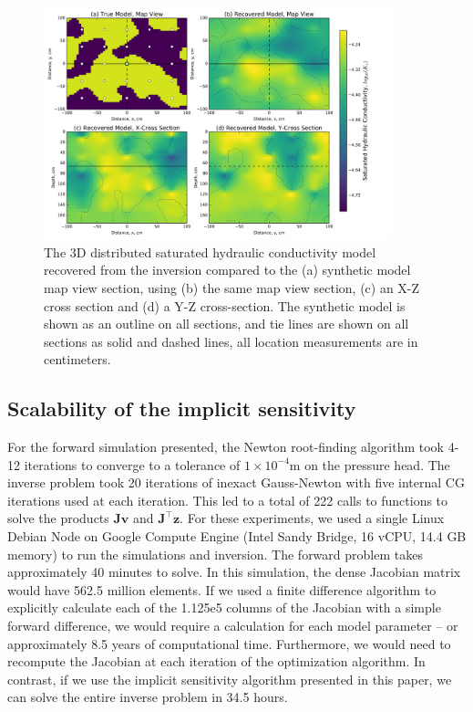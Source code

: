 \documentclass[preprint,review,3p,times,onecolumn,authoryear]{elsarticle}
\newcommand{\bfJ}{\mathbf{J}}
\newcommand{\bfv}{\mathbf{v}}
\newcommand{\bfz}{\mathbf{z}}
\begin{document}
\begin{figure}[!htbp]
\begin{center}
\includegraphics[width=0.9\textwidth]{inversion3d-results.png}
\end{center}
\caption{The 3D distributed saturated hydraulic conductivity model recovered from the inversion compared to the (a) synthetic model map view section, using (b) the same map view section, (c) an X-Z cross section and (d) a Y-Z cross-section. The synthetic model is shown as an outline on all sections, and tie lines are shown on all sections as solid and dashed lines, all location measurements are in centimeters.}
\label{fig:richards-inversion3d-results}
\end{figure}
\subsection{Scalability of the implicit sensitivity}
For the forward simulation presented, the Newton root-finding algorithm took 4-12 iterations to converge to a tolerance of $1\times10^{-4}$m on the pressure head. The inverse problem took 20 iterations of inexact Gauss-Newton with five internal CG iterations used at each iteration. This led to a total of 222 calls to functions to solve the products $\bfJ \bfv$ and $\bfJ^\top \bfz$. For these experiments, we used a single Linux Debian Node on Google Compute Engine (Intel Sandy Bridge, 16 vCPU, 14.4 GB memory) to run the simulations and inversion. The forward problem takes approximately 40 minutes to solve. In this simulation, the dense Jacobian matrix would have 562.5 million elements. If we used a finite difference algorithm to explicitly calculate each of the 1.125e5 columns of the Jacobian with a simple forward difference, we would require a calculation for each model parameter -- or approximately 8.5 years of computational time. Furthermore, we would need to recompute the Jacobian at each iteration of the optimization algorithm. In contrast, if we use the implicit sensitivity algorithm presented in this paper, we can solve the entire inverse problem in 34.5 hours.
\end{document}
